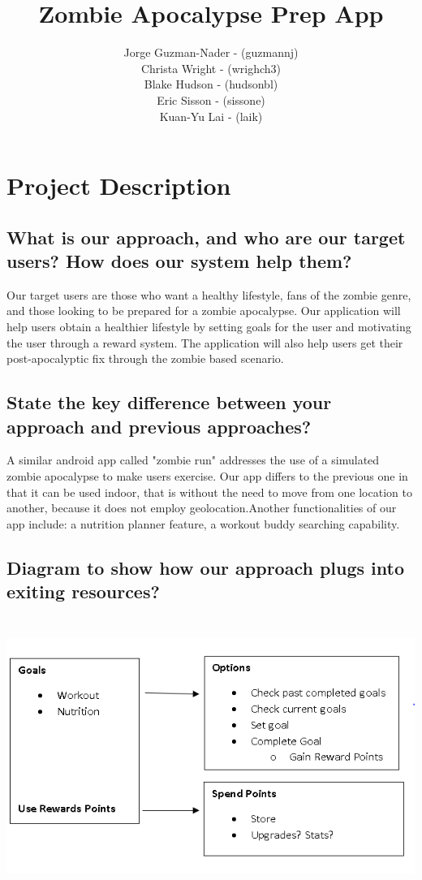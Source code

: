 \documentclass[a4paper]{article}
\title{Zombie Apocalypse Prep App  }
\author{Jorge Guzman-Nader - (guzmannj)\\ Christa Wright - (wrighch3)\\ Blake Hudson - (hudsonbl)\\ Eric Sisson -  (sissone)\\ Kuan-Yu Lai - (laik)}
\begin{document}
\maketitle


\section{Project Description}
\subsection{What is our approach, and who are our target users? How does our system help them?}
Our target users are those who want a healthy lifestyle, fans of the zombie genre, and those looking to be prepared for a zombie apocalypse.  Our application will help users obtain a healthier lifestyle by setting goals for the user and motivating the user through a reward system.  The application will also help users get their post-apocalyptic fix through the zombie based scenario.

\subsection{State the key difference between your approach and previous approaches?}
A similar android app called "zombie run" addresses the use of a simulated zombie apocalypse to make users exercise. Our app differs to the previous one in that it can be used indoor, that is without the need to move from one location to another, because it does not employ geolocation.Another functionalities of our app include: a nutrition planner feature, a workout buddy searching capability. 

\subsection{Diagram to show how our approach plugs into exiting resources?}
\graphicspath{ {files/Diagram.PNG} }
\includegraphics[width = 15cm, height=9cm]{Diagram}
\end{document}
